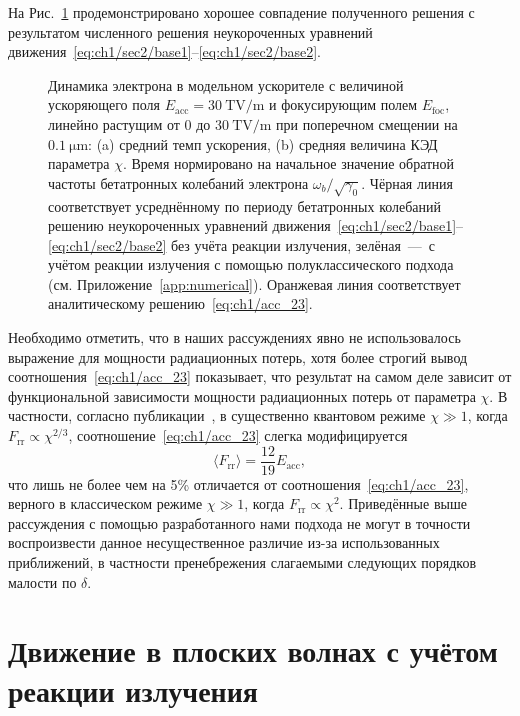 На Рис.~\ref{fig:ch1/accelerator} продемонстрировано хорошее совпадение полученного решения с результатом численного решения неукороченных уравнений движения~\eqref{eq:ch1/sec2/base1}--\eqref{eq:ch1/sec2/base2}.
\begin{figure}[ht]
    \caption[Динамика электрона в модельном ускорителе]{Динамика электрона в модельном ускорителе с величиной ускоряющего поля $E_\mathrm{acc} = \SI{30}{\tera\volt/\meter}$ и фокусирующим полем $E_\mathrm{foc}$, линейно растущим от 0 до $\SI{30}{\tera\volt/\meter}$ при поперечном смещении на $\SI{0.1}{\um}$: (a) средний темп ускорения, (b) средняя величина КЭД параметра $\chi$. Время нормировано на начальное значение обратной частоты бетатронных колебаний электрона $\omega_b/\sqrt{\gamma_0}$. Чёрная линия соответствует усреднённому по периоду бетатронных колебаний решению неукороченных уравнений движения~\eqref{eq:ch1/sec2/base1}--\eqref{eq:ch1/sec2/base2} без учёта реакции излучения, зелёная~---~с учётом реакции излучения с помощью полуклассического подхода (см. Приложение~\ref{app:numerical}). Оранжевая линия соответствует аналитическому решению~\eqref{eq:ch1/acc_23}.}
    \label{fig:ch1/accelerator}
\end{figure}
Необходимо отметить, что в наших рассуждениях явно не использовалось выражение для мощности радиационных потерь, хотя более строгий вывод соотношения~\eqref{eq:ch1/acc_23} показывает, что результат на самом деле зависит от функциональной зависимости мощности радиационных потерь от параметра $\chi$.
В частности, согласно публикации~\cite{golovanov2021radiation}, в существенно квантовом режиме $\chi \gg 1$, когда $F_\mathrm{rr}\propto \chi^{2/3}$, соотношение~\eqref{eq:ch1/acc_23} слегка модифицируется
\begin{equation}
    \langle F_\mathrm{rr} \rangle = \frac{12}{19} E_\mathrm{acc} ,
\end{equation}
что лишь не более чем на 5\% отличается от соотношения~\eqref{eq:ch1/acc_23}, верного в классическом режиме $\chi \gg 1$, когда $F_\mathrm{rr}\propto \chi^{2}$.
Приведённые выше рассуждения с помощью разработанного нами подхода не могут в точности воспроизвести данное несущественное различие из-за использованных приближений, в частности пренебрежения слагаемыми следующих порядков малости по $\delta$.

\section{Движение в плоских волнах с учётом реакции излучения}
\label{sub:ch1/sec5/EcrossB}

